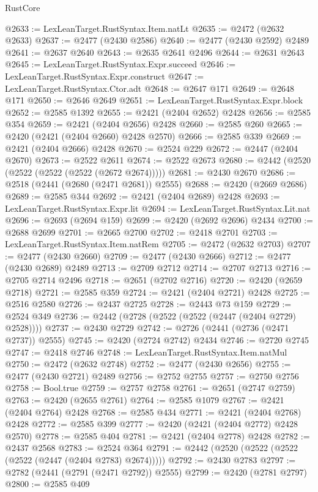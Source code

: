 \begin{lexlean}{RustCore}
\begin{coremodule}
@2633 := LexLeanTarget.RustSyntax.Item.natLt
@2635 := @2472 (@2632 @2633)
@2637 := @2477 (@2430 @2586)
@2640 := @2477 (@2430 @2592) @2489
@2641 := @2637 @2640
@2643 := @2635 @2641 @2496
@2644 := @2631 @2643
@2645 := LexLeanTarget.RustSyntax.Expr.succeed
@2646 := LexLeanTarget.RustSyntax.Expr.construct
@2647 := LexLeanTarget.RustSyntax.Ctor.adt
@2648 := @2647 @171
@2649 := @2648 @171
@2650 := @2646 @2649
@2651 := LexLeanTarget.RustSyntax.Expr.block
@2652 := @2585 @1392
@2655 := @2421 (@2404 @2652) @2428
@2656 := @2585 @354
@2659 := @2421 (@2404 @2656) @2428
@2660 := @2585 @260
@2665 := @2420 (@2421 (@2404 @2660) @2428 @2570)
@2666 := @2585 @339
@2669 := @2421 (@2404 @2666) @2428
@2670 := @2524 @229
@2672 := @2447 (@2404 @2670)
@2673 := @2522 @2611
@2674 := @2522 @2673
@2680 := @2442 (@2520 (@2522 (@2522 (@2522 (@2672 @2674)))))
@2681 := @2430 @2670
@2686 := @2518 (@2441 (@2680 (@2471 @2681)) @2555)
@2688 := @2420 (@2669 @2686)
@2689 := @2585 @344
@2692 := @2421 (@2404 @2689) @2428
@2693 := LexLeanTarget.RustSyntax.Expr.lit
@2694 := LexLeanTarget.RustSyntax.Lit.nat
@2696 := @2693 (@2694 @159)
@2699 := @2420 (@2692 @2696) @2434
@2700 := @2688 @2699
@2701 := @2665 @2700
@2702 := @2418 @2701
@2703 := LexLeanTarget.RustSyntax.Item.natRem
@2705 := @2472 (@2632 @2703)
@2707 := @2477 (@2430 @2660)
@2709 := @2477 (@2430 @2666)
@2712 := @2477 (@2430 @2689) @2489
@2713 := @2709 @2712
@2714 := @2707 @2713
@2716 := @2705 @2714 @2496
@2718 := @2651 (@2702 @2716)
@2720 := @2420 (@2659 @2718)
@2721 := @2585 @359
@2724 := @2421 (@2404 @2721) @2428
@2725 := @2516 @2580
@2726 := @2437 @2725
@2728 := @2443 @73 @159
@2729 := @2524 @349
@2736 := @2442 (@2728 (@2522 (@2522 (@2447 (@2404 @2729) @2528))))
@2737 := @2430 @2729
@2742 := @2726 (@2441 (@2736 (@2471 @2737)) @2555)
@2745 := @2420 (@2724 @2742) @2434
@2746 := @2720 @2745
@2747 := @2418 @2746
@2748 := LexLeanTarget.RustSyntax.Item.natMul
@2750 := @2472 (@2632 @2748)
@2752 := @2477 (@2430 @2656)
@2755 := @2477 (@2430 @2721) @2489
@2756 := @2752 @2755
@2757 := @2750 @2756
@2758 := Bool.true
@2759 := @2757 @2758
@2761 := @2651 (@2747 @2759)
@2763 := @2420 (@2655 @2761)
@2764 := @2585 @1079
@2767 := @2421 (@2404 @2764) @2428
@2768 := @2585 @434
@2771 := @2421 (@2404 @2768) @2428
@2772 := @2585 @399
@2777 := @2420 (@2421 (@2404 @2772) @2428 @2570)
@2778 := @2585 @404
@2781 := @2421 (@2404 @2778) @2428
@2782 := @2437 @2568
@2783 := @2524 @364
@2791 := @2442 (@2520 (@2522 (@2522 (@2522 (@2447 (@2404 @2783) @2674)))))
@2792 := @2430 @2783
@2797 := @2782 (@2441 (@2791 (@2471 @2792)) @2555)
@2799 := @2420 (@2781 @2797)
@2800 := @2585 @409

\end{coremodule}
\end{lexlean}
